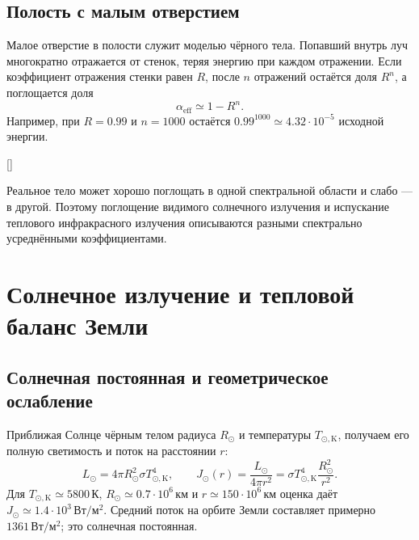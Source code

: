 \documentclass[../final.tex]{subfiles}
\begin{document}
\subsection{Полость с малым отверстием}
Малое отверстие в полости служит моделью чёрного тела.
Попавший внутрь луч многократно отражается от стенок, теряя энергию при каждом
отражении. Если коэффициент отражения стенки равен $R$, после $n$ отражений
остаётся доля $R^n$, а поглощается доля
\begin{equation*}
 \alpha_{\mathrm{eff}}\simeq1-R^n.
\end{equation*}
Например, при $R=0.99$ и $n=1000$ остаётся
$0.99^{1000}\simeq4.32\cdot10^{-5}$ исходной энергии.

\begin{rbox}[unbreakable,left=14pt,right=14pt,top=12pt,bottom=8pt]{[]}
\centering
\captionsetup{font=footnotesize,hypcap=false,skip=5pt}
\end{rbox}

Реальное тело может хорошо поглощать в одной спектральной области
и слабо --- в другой. Поэтому поглощение видимого солнечного излучения
и испускание теплового инфракрасного излучения описываются разными
спектрально усреднёнными коэффициентами.

\clearpage
\section{Солнечное излучение и тепловой баланс Земли}
\subsection{Солнечная постоянная и геометрическое ослабление}
Приближая Солнце чёрным телом радиуса $R_\odot$ и температуры $T_{\odot,\mathrm K}$,
получаем его полную светимость и поток на расстоянии $r$:
\begin{equation*}
 L_\odot=4\pi R_\odot^2\sigma T_{\odot,\mathrm K}^4,\qquad
 J_\odot(r)=\frac{L_\odot}{4\pi r^2}
 =\sigma T_{\odot,\mathrm K}^4\frac{R_\odot^2}{r^2}.
\end{equation*}
Для $T_{\odot,\mathrm K}\simeq5800\,\text{К}$,
$R_\odot\simeq0.7\cdot10^6\,\text{км}$ и
$r\simeq150\cdot10^6\,\text{км}$ оценка даёт
$J_\odot\simeq1.4\cdot10^3\,\text{Вт}/\text{м}^2$.
Средний поток на орбите Земли составляет примерно
$1361\,\text{Вт}/\text{м}^2$; это солнечная постоянная.
\end{document}
